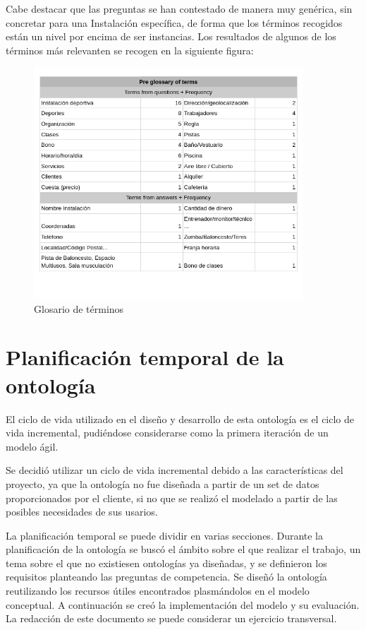 \documentclass[a4paper,12pt]{article}
\begin{document}
	Cabe destacar que las preguntas se han contestado de manera muy genérica, sin concretar para una Instalación específica, de forma que los términos recogidos están un nivel por encima de ser instancias. Los resultados de algunos de los términos más relevanten se recogen en la siguiente figura: 

	\begin{figure}[H]
		\centering
		\includegraphics[width=0.9\textwidth]{include/terms.png}
		\caption{Glosario de términos}		
	\end{figure}
	
	\section{Planificación temporal de la ontología}
		
	El ciclo de vida utilizado en el diseño y desarrollo de esta ontología es el ciclo de vida incremental, pudiéndose considerarse como la primera iteración de un modelo ágil.
	
	Se decidió utilizar un ciclo de vida incremental debido a las características del proyecto, ya que la ontología no fue diseñada a partir de un set de datos proporcionados por el cliente, si no que se realizó el modelado a partir de las posibles necesidades de sus usarios. 
	
	La planificación temporal se puede dividir en varias secciones. Durante la planificación de la ontología se buscó el ámbito sobre el que realizar el trabajo, un tema sobre el que no existiesen ontologías ya diseñadas, y se definieron los requisitos planteando las preguntas de competencia. Se diseñó la ontología reutilizando los recursos útiles encontrados plasmándolos en el modelo conceptual. A continuación se creó la implementación del modelo y su evaluación. La redacción de este documento se puede considerar un ejercicio transversal.
	
\end{document}
